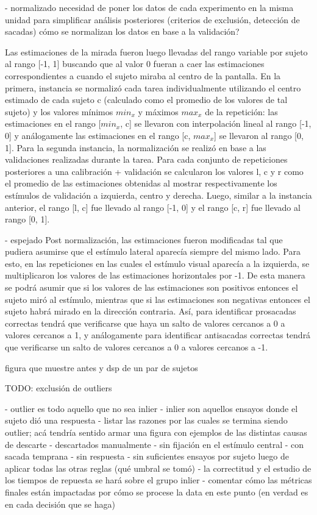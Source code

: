   - normalizado
  necesidad de poner los datos de cada experimento en la misma unidad para
  simplificar análisis posteriores (criterios de exclusión, detección de sacadas)
  cómo se normalizan los datos en base a la validación?

  Las estimaciones de la mirada fueron luego llevadas del rango variable por
  sujeto al rango [-1, 1] buscando que al valor 0 fueran a caer las estimaciones
  correspondientes a cuando el sujeto miraba al centro de la pantalla.
  En la primera, instancia se normalizó cada tarea individualmente utilizando el
  centro estimado de cada sujeto c (calculado como el promedio de los valores de
  tal sujeto) y los valores mínimos $min_x$ y máximos $max_x$ de la repetición:
  las estimaciones en el rango [$min_x$, c] se llevaron con interpolación lineal
  al rango [-1, 0] y análogamente las estimaciones en el rango [c, $max_x$] se
  llevaron al rango [0, 1].
  Para la segunda instancia, la normalización se realizó en base a las
  validaciones realizadas durante la tarea.
  Para cada conjunto de repeticiones posteriores a una calibración + validación
  se calcularon los valores l, c y r como el promedio de las estimaciones
  obtenidas al mostrar respectivamente los estímulos de validación a izquierda,
  centro y derecha.
  Luego, similar a la instancia anterior, el rango [l, c] fue llevado al rango
  [-1, 0] y el rango [c, r] fue llevado al rango [0, 1].

  - espejado
  Post normalización, las estimaciones fueron modificadas tal que pudiera
  asumirse que el estímulo lateral aparecía siempre del mismo lado.
  Para esto, en las repeticiones en las cuales el estímulo visual aparecía a la
  izquierda, se multiplicaron los valores de las estimaciones horizontales por
  -1.
  De esta manera se podrá asumir que si los valores de las estimaciones son
  positivos entonces el sujeto miró al estímulo, mientras que si las estimaciones
  son negativas entonces el sujeto habrá mirado en la dirección contraria.
  Así, para identificar prosacadas correctas tendrá que verificarse que haya un
  salto de valores cercanos a 0 a valores cercanos a 1, y análogamente para
  identificar antisacadas correctas tendrá que verificarse un salto de valores
  cercanos a 0 a valores cercanos a -1.

  figura que muestre antes y dsp de un par de sujetos

  TODO: exclusión de outliers

  - outlier es todo aquello que no sea inlier
  - inlier son aquellos ensayos donde el sujeto dió una respuesta 
  - listar las razones por las cuales se termina siendo outlier; acá tendría
  sentido armar una figura con ejemplos de las distintas causas de descarte
   - descartados manualmente
   - sin fijación en el estímulo central
   - con sacada temprana
   - sin respuesta
   - sin suficientes ensayos por sujeto luego de aplicar todas las otras reglas
   (qué umbral se tomó)
  - la correctitud y el estudio de los tiempos de repuesta se hará sobre el
    grupo inlier
  - comentar cómo las métricas finales están impactadas por cómo se procese la
    data en este punto (en verdad es en cada decisión que se haga)

